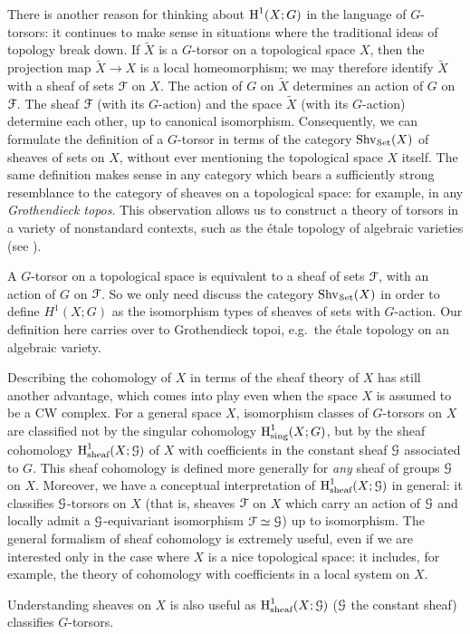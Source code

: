 There is another reason for thinking about $\operatorname{H}^{1}(X;G)$ in the language of $G$-torsors: it continues to make sense in situations where the traditional ideas of topology break down. If $\widetilde{X}$ is a $G$-torsor on a topological space $X$, then the projection map
$\widetilde{X} \rightarrow X$ is a local homeomorphism; we may therefore identify $\widetilde{X}$
with a sheaf of sets $\operatorname{\mathcal{F}}$ on $X$. The action of $G$ on $\widetilde{X}$ determines an action of
$G$ on $\operatorname{\mathcal{F}}$. The sheaf $\operatorname{\mathcal{F}}$ (with its $G$-action) and the space $\widetilde{X}$ (with its $G$-action) determine each other, up to canonical isomorphism. Consequently, we can formulate
the definition of a $G$-torsor in terms of the category $\operatorname{Shv}_{\operatorname{\mathcal{S}et}}(X)$ of sheaves of sets
on $X$, without ever mentioning the topological space $X$ itself. The same definition makes
sense in any category which bears a sufficiently strong resemblance to the category of sheaves on a topological space: for example, in any {\em Grothendieck topos}. This observation allows us to construct a theory of torsors in a variety of nonstandard contexts, such as the \'{e}tale topology of algebraic varieties (see \cite{SGA}).
\begin{shaded}
A $G$-torsor on a topological space is equivalent to a sheaf of sets $\operatorname{\mathcal{F}}$, with an action of $G$ on $\operatorname{\mathcal{F}}$. So we only need discuss the category $\operatorname{Shv}_{\operatorname{\mathcal{S}et}}(X)$ in order to define $H^1(X;G)$ as the isomorphism types of sheaves of sets with $G$-action. Our definition here carries over to Grothendieck topoi, e.g.\ the \'etale topology on an algebraic variety.
\end{shaded}


Describing the cohomology of $X$ in terms of the sheaf theory of $X$ has still another advantage, which comes into play even when the space $X$ is assumed to be a CW complex. For a general space
$X$, isomorphism classes of $G$-torsors on $X$ are classified not by the singular cohomology
$\operatorname{H}^1_{\text{sing}}(X;G)$, but by the sheaf cohomology $\operatorname{H}^{1}_{\text{sheaf}}(X; \operatorname{\mathcal{G}})$ of
$X$ with coefficients in the constant sheaf $\operatorname{\mathcal{G}}$ associated to $G$. This sheaf cohomology is defined more generally for {\em any} sheaf of groups $\operatorname{\mathcal{G}}$ on $X$.
Moreover, we have a conceptual interpretation of $\operatorname{H}^{1}_{\text{sheaf}}(X; \operatorname{\mathcal{G}})$ in general: it classifies
$\operatorname{\mathcal{G}}$-torsors on $X$ (that is, sheaves $\operatorname{\mathcal{F}}$ on $X$ which carry an action of $\operatorname{\mathcal{G}}$ and locally admit a $\operatorname{\mathcal{G}}$-equivariant isomorphism $\operatorname{\mathcal{F}} \simeq \operatorname{\mathcal{G}}$) up to isomorphism. The general formalism of sheaf cohomology is extremely useful, even if we are interested only in the case where $X$ is a nice topological space: it includes, for example, the theory of cohomology with coefficients in a local system on $X$.
\begin{shaded}
Understanding sheaves on $X$ is also useful as $\operatorname{H}^{1}_{\text{sheaf}}(X; \operatorname{\mathcal{G}})$ ($\operatorname{\mathcal{G}}$ the constant sheaf) classifies $G$-torsors.
\end{shaded}


